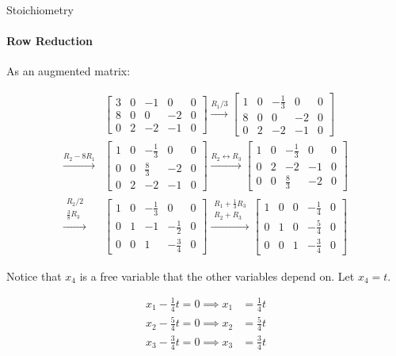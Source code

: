 \documentclass{beamer}
\begin{document}
\begin{frame}{Stoichiometry}
\framesubtitle{Row Reduction}
As an augmented matrix:
{\tiny 
\begin{align*}
&\left[ 
    \begin{array}{cccc|c}
    3 & 0 & -1 & 0 & 0\\
    8 & 0 & 0 & -2 & 0\\
    0 & 2 & -2 & -1 & 0
    \end{array}
\right]
\xrightarrow{R_1/3}
\left[ 
    \begin{array}{cccc|c}
    1 & 0 & -\frac{1}{3} & 0 & 0\\
    8 & 0 & 0 & -2 & 0\\
    0 & 2 & -2 & -1 & 0
    \end{array}
\right] \\
\xrightarrow{R_2 - 8R_1}
&\left[ 
    \begin{array}{cccc|c}
    1 & 0 & -\frac{1}{3} & 0 & 0\\
    0 & 0 & \frac{8}{3} & -2 & 0\\
    0 & 2 & -2 & -1 & 0
    \end{array}
\right]
\xrightarrow{R_2 \leftrightarrow R_3}
\left[ 
    \begin{array}{cccc|c}
    1 & 0 & -\frac{1}{3} & 0 & 0\\
    0 & 2 & -2 & -1 & 0\\
    0 & 0 & \frac{8}{3} & -2 & 0
    \end{array}
\right] \\
\xrightarrow{\substack{R_{2}/2 \\ \frac{3}{8}R_{3}}}
&\left[ 
    \begin{array}{cccc|c}
    1 & 0 & -\frac{1}{3} & 0 & 0\\
    0 & 1 & -1 & -\frac{1}{2} & 0\\
    0 & 0 & 1 & -\frac{3}{4} & 0
    \end{array}
\right] 
\xrightarrow{\substack{R_{1} + \frac{1}{3}R_3 \\ R_2 + R_3}}
\left[ 
    \begin{array}{cccc|c}
    1 & 0 & 0 & -\frac{1}{4} & 0 \\
    0 & 1 & 0 & -\frac{5}{4} & 0 \\
    0 & 0 & 1 & -\frac{3}{4} & 0
    \end{array}
\right] 
\end{align*}

Notice that $x_4$ is a free variable that the other variables depend on. Let $x_4 = t$.

\begin{align*}
    x_1 - \frac{1}{4}t = 0 \implies x_1 &= \frac{1}{4}t \\
    x_2 - \frac{5}{4}t = 0 \implies x_2 &= \frac{5}{4}t \\
    x_3 - \frac{3}{4}t = 0 \implies x_3 &= \frac{3}{4}t
\end{align*}
}
\end{frame}
\end{document}
